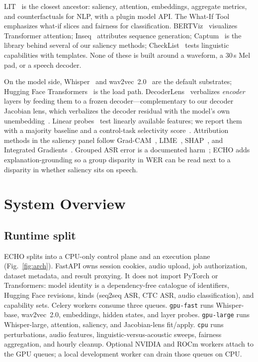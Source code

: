 \documentclass[conference]{IEEEtran}
\begin{document}
LIT~\cite{tenney2020lit} is the closest ancestor: saliency, attention, embeddings, aggregate metrics, and counterfactuals for NLP, with a plugin model API. The What-If Tool~\cite{wexler2019whatif} emphasizes what-if slices and fairness for classification. BERTViz~\cite{vig2019bertviz} visualizes Transformer attention; Inseq~\cite{sarti2023inseq} attributes sequence generation; Captum~\cite{kokhlikyan2020captum} is the library behind several of our saliency methods; CheckList~\cite{ribeiro2020checklist} tests linguistic capabilities with templates. None of these is built around a waveform, a 30\,s Mel pad, or a speech decoder.

On the model side, Whisper~\cite{radford2023whisper} and wav2vec~2.0~\cite{baevski2020wav2vec2} are the default substrates; Hugging Face Transformers~\cite{wolf2020transformers} is the load path. DecoderLens~\cite{langedijk2024decoderlens} verbalizes \emph{encoder} layers by feeding them to a frozen decoder---complementary to our decoder Jacobian lens, which verbalizes the decoder residual with the model's own unembedding~\cite{gurnee2026workspace}. Linear probes~\cite{alain2017probes,hewitt2019structural,belinkov2022probing} test linearly available features; we report them with a majority baseline and a control-task selectivity score~\cite{hewitt2019control}. Attribution methods in the saliency panel follow Grad-CAM~\cite{selvaraju2017gradcam}, LIME~\cite{ribeiro2016lime}, SHAP~\cite{lundberg2017shap}, and Integrated Gradients~\cite{sundararajan2017ig}. Grouped ASR error is a documented harm~\cite{koenecke2020racial}; ECHO adds explanation-grounding so a group disparity in WER can be read next to a disparity in whether saliency sits on speech.

\section{System Overview}

\subsection{Runtime split}

ECHO splits into a CPU-only control plane and an execution plane (Fig.~\ref{fig:arch}). FastAPI owns session cookies, audio upload, job authorization, dataset metadata, and result proxying. It does not import PyTorch or Transformers: model identity is a dependency-free catalogue of identifiers, Hugging Face revisions, kinds (seq2seq ASR, CTC ASR, audio classification), and capability sets. Celery workers consume three queues. \texttt{gpu-fast} runs Whisper-base, wav2vec~2.0, embeddings, hidden states, and layer probes. \texttt{gpu-large} runs Whisper-large, attention, saliency, and Jacobian-lens fit/apply. \texttt{cpu} runs perturbations, audio features, linguistic-versus-acoustic sweeps, fairness aggregation, and hourly cleanup. Optional NVIDIA and ROCm workers attach to the GPU queues; a local development worker can drain those queues on CPU.
\end{document}
